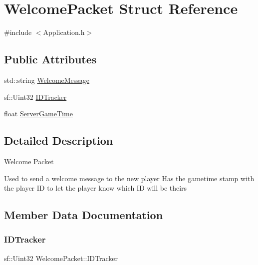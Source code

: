 \hypertarget{struct_welcome_packet}{}\section{Welcome\+Packet Struct Reference}
\label{struct_welcome_packet}


{\ttfamily \#include $<$Application.\+h$>$}

\subsection*{Public Attributes}
\begin{DoxyCompactItemize}
\item 
std\+::string \hyperlink{struct_welcome_packet_a47dfa4e9e9ea5a2511e2478300a7be02}{Welcome\+Message}
\item 
sf\+::\+Uint32 \hyperlink{struct_welcome_packet_ad146d96099aa06bea8af09bf4ff4bce0}{I\+D\+Tracker}
\item 
float \hyperlink{struct_welcome_packet_a624e167fac1995026c537b75954ae940}{Server\+Game\+Time}
\end{DoxyCompactItemize}


\subsection{Detailed Description}
Welcome Packet

Used to send a welcome message to the new player Has the gametime stamp with the player ID to let the player know which ID will be theirs 

\subsection{Member Data Documentation}
\hypertarget{struct_welcome_packet_ad146d96099aa06bea8af09bf4ff4bce0}{}\label{struct_welcome_packet_ad146d96099aa06bea8af09bf4ff4bce0} 
\subsubsection{\texorpdfstring{I\+D\+Tracker}{IDTracker}}
{\footnotesize\ttfamily sf\+::\+Uint32 Welcome\+Packet\+::\+I\+D\+Tracker}

\hypertarget{struct_welcome_packet_a624e167fac1995026c537b75954ae940}{}\label{struct_welcome_packet_a624e167fac1995026c537b75954ae940} 
